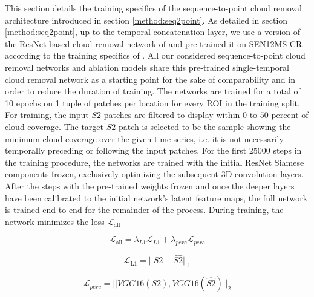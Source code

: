 \documentclass[journal]{IEEEtran}
\begin{document}
This section details the training specifics of the sequence-to-point cloud removal architecture introduced in section \ref{method:seq2point}.
As detailed in section \ref{method:seq2point}, up to the temporal concatenation layer, we use a version of the ResNet-based \cite{he2016deep} cloud removal network of \cite{meraner2020cloud} and pre-trained it on SEN12MS-CR \cite{ebel2020multisensor} according to the training specifics of \cite{meraner2020cloud}. All our considered sequence-to-point cloud removal networks and ablation models share this pre-trained single-temporal cloud removal network as a starting point for the sake of comparability and in order to reduce the duration of training. The networks are trained for a total of 10 epochs on 1 tuple of patches per location for every ROI in the training split. For training, the input $S2$ patches are filtered to display within $0$ to $50$ percent of cloud coverage. The target $S2$ patch is selected to be the sample showing the minimum cloud coverage over the given time series, i.e. it is not necessarily temporally preceding or following the input patches. For the first 25000 steps in the training procedure, the networks are trained with the initial ResNet Siamese components frozen, exclusively optimizing the subsequent 3D-convolution layers. After the steps with the pre-trained weights frozen and once the deeper layers have been calibrated to the initial network's latent feature maps, the full network is trained end-to-end for the remainder of the process. During training, the network minimizes the loss $\mathcal{L}_\text{all}$ 

\begin{equation}
\label{eq:Lall_seq2point}
\mathcal{L}_\text{all} = \lambda_{L1} \mathcal{L}_{L1} + \lambda_{perc} \mathcal{L}_{perc}
\end{equation}

\begin{equation}
\label{eq:L1_seq2point}
\mathcal{L}_\text{L1} = ||S2-\hat{S2}||_1
\end{equation}

\begin{equation}
\label{eq:Lperc_seq2point}
\mathcal{L}_{perc} = ||VGG16(S2), VGG16(\hat{S2})||_2
\end{equation}
\end{document}
